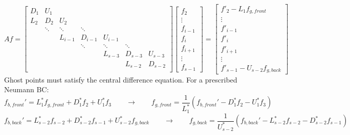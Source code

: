 \documentclass[11pt]{article}
\begin{document}
\[ Af = \left[
\begin{array}{ccccccccc}
D_{1} & U_{1}    &           &           &           &           &         \\
L_{2} & D_{2}    & U_{2}     &           &           &           &         \\
      & \ddots   & \ddots    & \ddots    &           &           &         \\
      &          & L_{i-1}   & D_{i-1}   & U_{i-1}   &           &         \\
      &          &           & \ddots    & \ddots    & \ddots    &         \\
      &          &           &           & L_{s-3}   & D_{s-3}   & U_{s-3} \\
      &          &           &           &           & L_{s-2}   & D_{s-2} \\
\end{array} \right]
\left[ \begin{array}{c}
f_{2} \\ \vdots \\ f_{i-1} \\ f_{i} \\ f_{i+1} \\ \vdots \\ f_{s-1}
\end{array} \right]
=
\left[ \begin{array}{c}
f'_{2} - L_1 f_{g,front} \\ \vdots \\
f'_{i-1} \\ f'_{i} \\ f'_{i+1} \\ \vdots \\ f'_{s-1} - U_{s-2} f_{g,back}
\end{array} \right]
\]
\noindent
Ghost points must satisfy the central difference equation. For a prescribed Neumann BC:
\begin{equation}
      f_{b,front}' = L_1^* f_{g,front} + D_1^* f_2 + U_1^* f_3
      \qquad \rightarrow \qquad
      f_{g,front} = \frac{1}{L_1^*} (f_{b,front}' - D_1^* f_2 - U_1^* f_3)
\end{equation}
\begin{equation}
      f_{b,back}' = L_{s-2}^* f_{s-2} + D_{s-2}^* f_{s-1} + U_{s-2}^* f_{g,back}
      \qquad \rightarrow \qquad
      f_{g,back} = \frac{1}{U_{s-2}^*} (f_{b,back}' - L_{s-2}^* f_{s-2} - D_{s-2}^* f_{s-1})
\end{equation}
\end{document}
